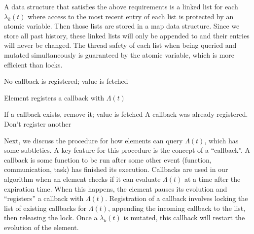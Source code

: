 \begin{bibunit}[unsrtnat]
A data structure that satisfies the above requirements is a linked list for each
$\lambda_k(t)$ where access to the most recent entry of each list is protected
by an atomic variable. Then those lists are stored in a map data structure.
Since we store all past history, these linked lists will only be appended to and
their entries will never be changed. The thread safety of each list when being
queried and mutated simultaneously is guaranteed by the atomic variable, which
is more efficient than locks.

\LinesNumbered
\begin{algorithm}
\SetAlgoNoLine
\DontPrintSemicolon
\caption{Registering a callback with $\Lambda(t)$}\label{alg:lambda}
   {
    No callback is registered; value is fetched
  }{\label{alg:lambda-else-1}
    Element registers a callback with $\Lambda(t)$\label{alg:lambda-else-1-body}

     {\label{alg:lambda-if-2}
      If a callback exists, remove it; value is fetched
    }{
      A callback was already registered. Don't register another
    }
  }
\end{algorithm}

Next, we discuss the procedure for how elements can query $\Lambda(t)$, which
has some subtleties. A key feature for this procedure is the concept of a
``callback''. A callback is some function to be run after some other event
(function, communication, task) has finished its execution. Callbacks are used
in our algorithm when an element checks if it can evaluate $\Lambda(t)$ at a
time after the expiration time. When this happens, the element pauses its
evolution and ``registers'' a callback with $\Lambda(t)$. Registration of a
callback involves locking the list of existing callbacks for $\Lambda(t)$,
appending the incoming callback to the list, then releasing the lock. Once a
$\lambda_k(t)$ is mutated, this callback will restart the evolution of the
element.


\end{bibunit}
